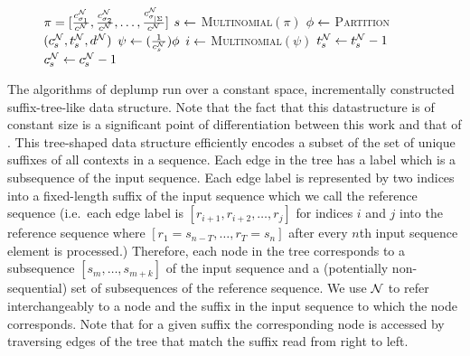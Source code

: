 \begin{figure*}[ttt!]
\begin{minipage}[t]{.48\linewidth}
\begin{algorithm}[H]
\begin{algorithmic}[1]
			\State $\pi = [\frac{c^\N_{\sigma_1}}{c^\N}, \frac{c^\N_{\sigma_2}}{c^\N}, \ldots, \frac{c^\N_{\sigma_{|\Sigma}}}{c^\N}]$
			\State $s \la $ \textsc{Multinomial}$(\pi)$ %
			\State $\phi \la$ \textsc{Partition}$(c^\N_s, t^\N_s, d^{\N})$
			\State $\psi \la (\frac{1}{c^\N_{s}} ) \phi$
			\State $i \la$ \textsc{Multinomial}$(\psi)$
				\State $t^\N_s \la t^\N_s - 1$
			\EndIf
			\State $c^\N_s \la c^\N_s - 1$
		\EndWhile
	\EndFunction	
	\end{algorithmic}	
\end{algorithm}
	\end{minipage}
	\end{figure*}

The algorithms of deplump run over a constant space, incrementally constructed suffix-tree-like data structure.  Note that the fact that this datastructure is of constant size is a significant point of  differentiation between this work and that of \cite{Gasthaus2010}. This tree-shaped data structure efficiently encodes a subset of the set of unique suffixes of all contexts in a sequence.  Each edge in the tree has a label which is a subsequence of the input sequence.  Each edge label is represented by two indices into a fixed-length suffix of the input sequence which we call the reference sequence (i.e.~each edge label is $[r_{i+1}, r_{i+2}, \ldots,r_{j}]$ for indices $i$ and $j$ into the reference sequence where $[r_{1} = s_{n-T}, \ldots, r_T = s_n]$ after every $n$th input sequence element is processed.)  
Therefore, each node in the tree corresponds to a subsequence $[s_m, \ldots, s_{m + k}]$ of the input sequence and a (potentially non-sequential) set of subsequences of the reference sequence.  
We use $\N$ to refer interchangeably to a node and the suffix in the input sequence to which the node corresponds.  Note that for a given suffix the corresponding node is accessed by traversing edges of the tree that match the suffix read from right to left. 
\begin{figure*}[ttt!]
\begin{minipage}[t]{.48\linewidth}

\end{minipage}
\hfill
\end{figure*}

